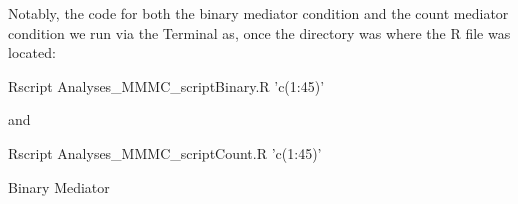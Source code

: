 \documentclass[]{DissertateUSU}
\newenvironment{Shaded}{\begin{snugshade}}{\end{snugshade}}
\newcommand{\StringTok}[1]{\textcolor[rgb]{0.31,0.60,0.02}{#1}}
\newcommand{\ExtensionTok}[1]{#1}
\newcommand{\NormalTok}[1]{#1}
\begin{document}
Notably, the code for both the binary mediator condition and the count
mediator condition we run via the Terminal as, once the directory was
where the R file was located:

\small

\begin{Shaded}
\begin{Highlighting}[]
\ExtensionTok{Rscript}\NormalTok{ Analyses_MMMC_scriptBinary.R }\StringTok{'c(1:45)'}
\end{Highlighting}
\end{Shaded}

\normalsize

\noindent and

\small

\begin{Shaded}
\begin{Highlighting}[]
\ExtensionTok{Rscript}\NormalTok{ Analyses_MMMC_scriptCount.R }\StringTok{'c(1:45)'}
\end{Highlighting}
\end{Shaded}

\normalsize

Binary Mediator

\small
\end{document}
